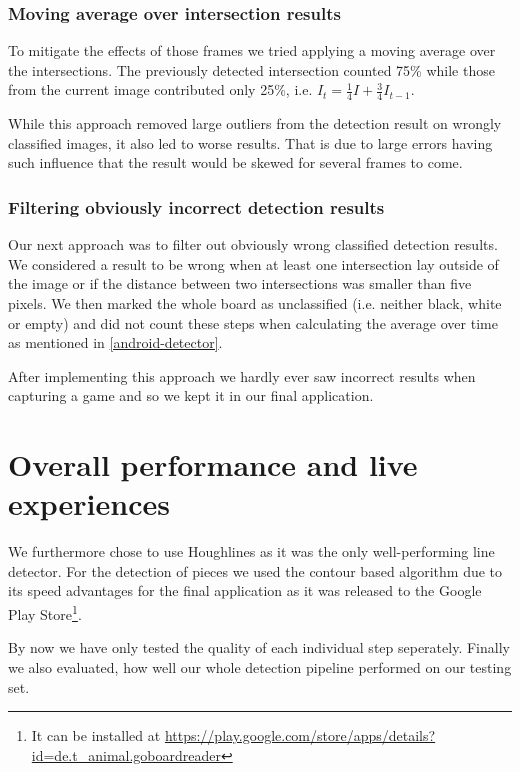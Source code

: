 	\subsubsection{Moving average over intersection results}
	\label{evaluation-prepostprocessing-filteringOutliers-movingAverage}
	To mitigate the effects of those frames we tried applying a moving average over the intersections. The previously detected intersection counted 75\% while those from the current image contributed only 25\%, i.e. $I_t = \frac{1}{4}I + \frac{3}{4}I_{t-1}$.

	While this approach removed large outliers from the detection result on wrongly classified images, it also led to worse results. That is due to large errors having such influence that the result would be skewed for several frames to come.

	\subsubsection{Filtering obviously incorrect detection results}
	\label{evaluation-prepostprocessing-filteringOutliers-filteringWrong}
	Our next approach was to filter out obviously wrong classified detection results. We considered a result to be wrong when at least one intersection lay outside of the image or if the distance between two intersections was smaller than five pixels. We then marked the whole board as unclassified (i.e. neither black, white or empty) and did not count these steps when calculating the average over time as mentioned in \autoref{android-detector}.

	After implementing this approach we hardly ever saw incorrect results when capturing a game and so we kept it in our final application.





	\section{Overall performance and live experiences}
	\label{evaluation-overallPerformance}
	We furthermore chose to use Houghlines as it was the only well-performing line detector. For the detection of pieces we used the contour based algorithm due to its speed advantages for the final application as it was released to the Google Play Store\footnote{It can be installed at \url{https://play.google.com/store/apps/details?id=de.t_animal.goboardreader}}.
	
	By now we have only tested the quality of each individual step seperately. Finally we also evaluated, how well our whole detection pipeline performed on our testing set.

